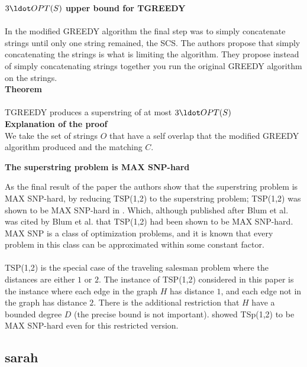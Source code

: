 \documentclass[letterpaper,11pt,titlepage]{article}
\begin{document}
\textbf{$3 \ldot OPT(S)$ upper bound for TGREEDY}\\\\

In the modified GREEDY algorithm the final step was to simply concatenate strings until only one string remained, the SCS. The authors propose that simply concatenating the strings is what is limiting the algorithm. They propose instead of simply concatenating strings together you run the original GREEDY algorithm on the strings. \\

\textbf{Theorem} \\\\
TGREEDY produces a superstring of at most $3 \ldot OPT(S)$\\

\textbf{Explanation of the proof}\\

We take the set of strings $O$ that have a self overlap that the modified GREEDY algorithm produced and the matching $C$. 


\textbf{The superstring problem is MAX SNP-hard}

As the final result of the paper the authors show that the superstring problem is MAX SNP-hard, by reducing TSP(1,2) to the superstring problem; TSP(1,2) was shown to be MAX SNP-hard in \cite{papadimitriou1993}.  Which, although published after Blum et al. was cited by Blum et al. that TSP(1,2) had been shown to be MAX SNP-hard.  MAX SNP is a class of optimization problems, and it is known that every problem in this class can be approximated within some constant factor.  \\ \\

TSP(1,2) is the special case of the traveling salesman problem where the distances are either $1$ or $2$.  The instance of TSP(1,2) considered in this paper is the instance where each edge in the graph $H$ has distance $1$, and each edge not in the graph has distance $2$.  There is the additional restriction that $H$ have a bounded degree $D$ (the precise bound is not important).  \cite{papadimitriou1993} showed TSp(1,2) to be MAX SNP-hard even for this restricted version.  

\subsection{sarah}
\end{document}
